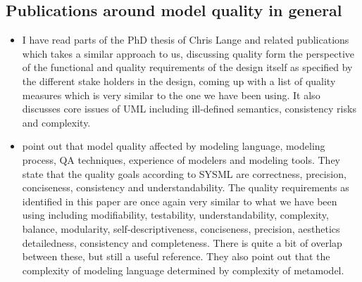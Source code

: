 \subsection{Publications around model quality in general}
  \begin{itemize}
    \item I have read parts of the PhD thesis of Chris Lange \cite{lange_christiaan_assessing_2007} and related publications \cite{lange_empirical_2004,lange_improving_2006} which takes a similar approach to us, discussing quality form the perspective of the functional and quality requirements of the design itself as specified by the different stake holders in the design, coming up with a list of quality measures which is very similar to the one we have been using. It also discusses core issues of UML including ill-defined semantics, consistency risks and complexity.
    \item \cite{mohagheghi_evaluating_2007} point out that model quality affected by modeling language, modeling process, QA techniques, experience of modelers and modeling tools. They state that the quality goals according to SYSML are correctness, precision, conciseness, consistency and understandability. The quality requirements as identified in this paper are once again very similar to what we have been using including modifiability, testability, understandability, complexity, balance, modularity, self-descriptiveness, conciseness, precision, aesthetics detailedness, consistency and completeness. There is quite a bit of overlap between these, but still a useful reference. They also point out that the complexity of modeling language determined by complexity of metamodel.

\end{itemize}
